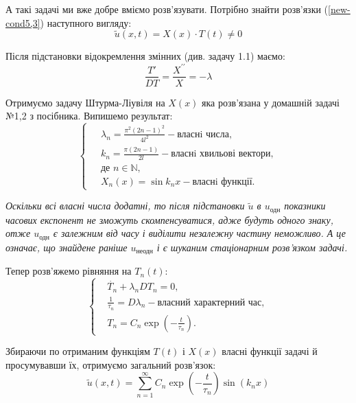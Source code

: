 А такі задачі ми вже добре вміємо розв'язувати. Потрібно знайти розв'язки (\ref{new-cond5,3})
наступного вигляду:
\begin{equation} \label{subst5,3}
    \tilde{u}(x,t) = X(x) \cdot T(t) \neq 0 
\end{equation}

Після підстановки відокремлення змінних (див. задачу 1.1) маємо:
\begin{equation}
    \frac{T'}{DT} = \frac{X^{\prime\prime}}{X} = -\lambda
\end{equation}

Отримуємо задачу Штурма-Ліувіля на $X(x)$ яка розв'язана у домашній задачі №1,2 з посібника. Випишемо результат:
  \begin{equation} 
        \left\{ \begin{aligned}
            \;&\lambda_n = \frac{\pi^2 (2n-1)^2}{4l^2} - \text{власнi числа},\\
            &k_n = \frac{\pi (2n-1)}{2l} - \text{власнi хвильові вектори},\\
            &\text{де } n \in \mathbb{N},\\ 
            &X_n(x) = \sin k_nx - \text{власнi функції}.
        \end{aligned} \right.
    \end{equation}

\textit{Оскільки всі власні числа додатні, то після підстановки $\tilde{u}$ в $u_{\text{одн}}$ показники часових експонент не зможуть скомпенсуватися, адже будуть одного знаку, отже $u_{\text{одн}}$ є залежним від часу і виділити незалежну частину неможливо. А це означає, що знайдене раніше $u_{\text{неодн}}$ і є шуканим стаціонарним розв'язком задачі.}

Тепер розв'яжемо рівняння на $T_n(t)$:
\begin{equation} 
    \left\{ \begin{aligned}
        &\dot{T_n} + \lambda_n DT_n = 0,\\
        &\frac1{\tau_n} = D\lambda_n - \text{власний характерний час},\\
        &T_n = C_n\exp{\left(-\frac{t}{\tau_n}\right)}.
    \end{aligned} \right.
\end{equation}

Збираючи по отриманим функціям $T(t)$ і $X(x)$ власні функції задачі й просумувавши їх, отримуємо загальний розв'язок:
\begin{equation} \label{mode5,3}
    \tilde{u}(x,t) = \sum_{n=1}^{\infty} C_n\exp{\left(-\frac{t}{\tau_n}\right)}\sin(k_n x)
\end{equation}

